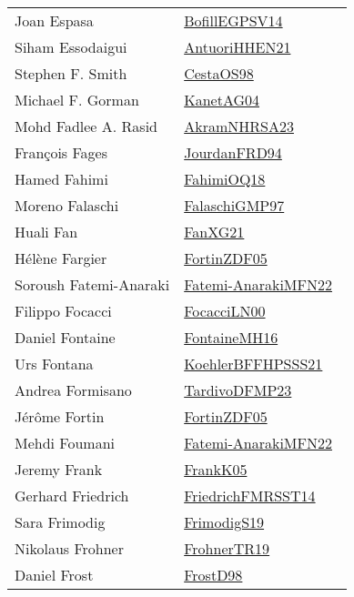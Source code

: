 {\begin{longtable}{p{4cm}p{20cm}}
Joan Espasa & \href{works/BofillEGPSV14.pdf}{BofillEGPSV14}~\cite{BofillEGPSV14}\\
Siham Essodaigui & \href{works/AntuoriHHEN21.pdf}{AntuoriHHEN21}~\cite{AntuoriHHEN21}\\
Stephen F. Smith & \href{works/CestaOS98.pdf}{CestaOS98}~\cite{CestaOS98}\\
Michael F. Gorman & \href{}{KanetAG04}~\cite{KanetAG04}\\
Mohd Fadlee A. Rasid & \href{works/AkramNHRSA23.pdf}{AkramNHRSA23}~\cite{AkramNHRSA23}\\
Fran{\c{c}}ois Fages & \href{}{JourdanFRD94}~\cite{JourdanFRD94}\\
Hamed Fahimi & \href{works/FahimiOQ18.pdf}{FahimiOQ18}~\cite{FahimiOQ18}\\
Moreno Falaschi & \href{works/FalaschiGMP97.pdf}{FalaschiGMP97}~\cite{FalaschiGMP97}\\
Huali Fan & \href{works/FanXG21.pdf}{FanXG21}~\cite{FanXG21}\\
H{\'{e}}l{\`{e}}ne Fargier & \href{works/FortinZDF05.pdf}{FortinZDF05}~\cite{FortinZDF05}\\
Soroush Fatemi-Anaraki & \href{}{Fatemi-AnarakiMFN22}~\cite{Fatemi-AnarakiMFN22}\\
Filippo Focacci & \href{works/FocacciLN00.pdf}{FocacciLN00}~\cite{FocacciLN00}\\
Daniel Fontaine & \href{works/FontaineMH16.pdf}{FontaineMH16}~\cite{FontaineMH16}\\
Urs Fontana & \href{works/KoehlerBFFHPSSS21.pdf}{KoehlerBFFHPSSS21}~\cite{KoehlerBFFHPSSS21}\\
Andrea Formisano & \href{works/TardivoDFMP23.pdf}{TardivoDFMP23}~\cite{TardivoDFMP23}\\
J{\'{e}}r{\^{o}}me Fortin & \href{works/FortinZDF05.pdf}{FortinZDF05}~\cite{FortinZDF05}\\
Mehdi Foumani & \href{}{Fatemi-AnarakiMFN22}~\cite{Fatemi-AnarakiMFN22}\\
Jeremy Frank & \href{works/FrankK05.pdf}{FrankK05}~\cite{FrankK05}\\
Gerhard Friedrich & \href{}{FriedrichFMRSST14}~\cite{FriedrichFMRSST14}\\
Sara Frimodig & \href{works/FrimodigS19.pdf}{FrimodigS19}~\cite{FrimodigS19}\\
Nikolaus Frohner & \href{works/FrohnerTR19.pdf}{FrohnerTR19}~\cite{FrohnerTR19}\\
Daniel Frost & \href{works/FrostD98.pdf}{FrostD98}~\cite{FrostD98}\\

\end{longtable}}
